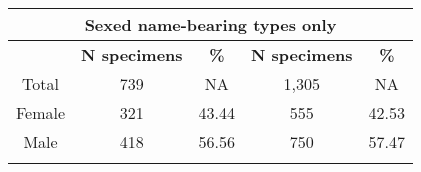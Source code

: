 \begin{longtable}{ccccc}
  \multicolumn{5}{c}{\textbf{Sexed name-bearing types only}}\\
  \hline
  & \textbf{N specimens} & \textbf{\%} & \textbf{N specimens} & \textbf{\%}\\
  \hline
  Total & 739 & NA & 1,305 & NA\\
  Female & 321 & 43.44 & 555 & 42.53\\
  Male & 418 & 56.56 & 750 & 57.47\\
  \hline

\label{table_A1}
\end{longtable}





